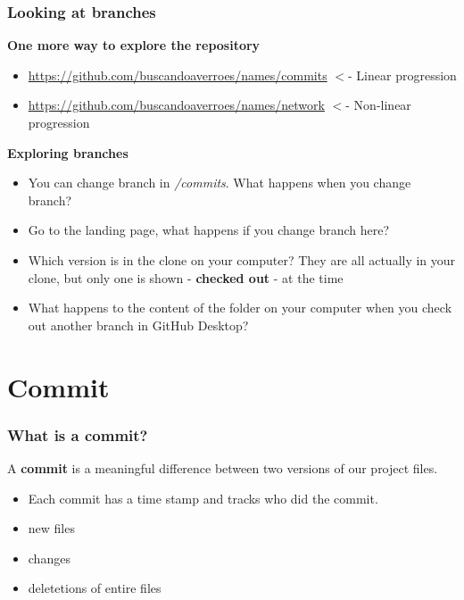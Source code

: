 \documentclass[aspectratio=169]{beamer} %
\newcommand{\trainingURL}[1]{{\color{blue}\url{#1}}}
\newcommand{\traininerUsername}{buscandoaverroes}
\newcommand{\repoName}{\traininerUsername/names}
\newcommand{\trainingRepoURL}[1]{\trainingURL{https://github.com/\repoName #1}}
\begin{document}
\begin{frame}
\frametitle{Looking at branches}


	\textbf{One more way to explore the repository}
	\begin{itemize}
		\item \trainingRepoURL{/commits} $<$- Linear progression
		\item \trainingRepoURL{/network} $<$- Non-linear progression
	\end{itemize}

	\vspace{.1cm}

	\textbf{Exploring branches}
	\begin{itemize}
		\item You can change branch in \textit{/commits}. What happens when you change branch?
		\item Go to the landing page, what happens if you change branch here?
		\item Which version is in the clone on your computer? They are all actually in your clone, but only one is shown - \textbf{checked out} - at the time
		\item What happens to the content of the folder on your computer when you check out another branch in GitHub Desktop?
	\end{itemize}

\end{frame}




\section{Commit}

\begin{frame}
\frametitle{What is a commit?}

	A \textbf{commit} is a meaningful difference between two versions of our project files.

	\vspace{.25cm}
	\begin{itemize}
		\item Each commit has a time stamp and tracks who did the commit.
		\item new files
		\item changes
		\item deletetions of entire files
	\end{itemize}



\end{frame}
\end{document}
